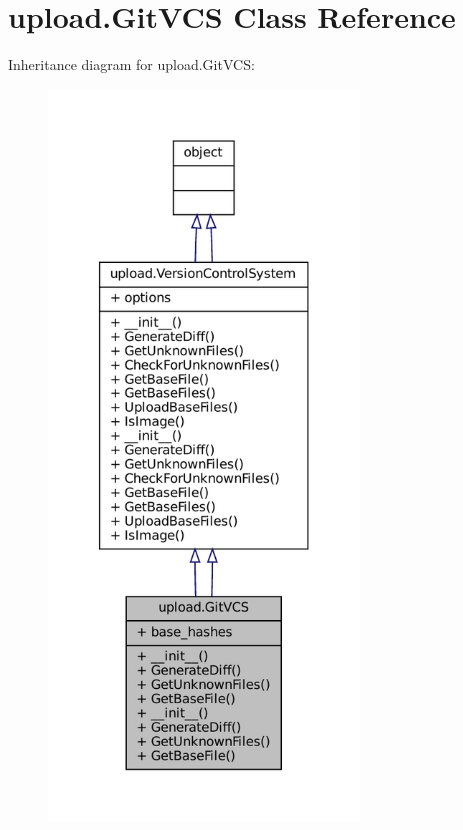 \hypertarget{classupload_1_1GitVCS}{}\section{upload.\+Git\+V\+CS Class Reference}
\label{classupload_1_1GitVCS}


Inheritance diagram for upload.\+Git\+V\+CS\+:
\nopagebreak
\begin{figure}[H]
\begin{center}
\leavevmode
\includegraphics[height=550pt]{classupload_1_1GitVCS__inherit__graph}
\end{center}
\end{figure}


